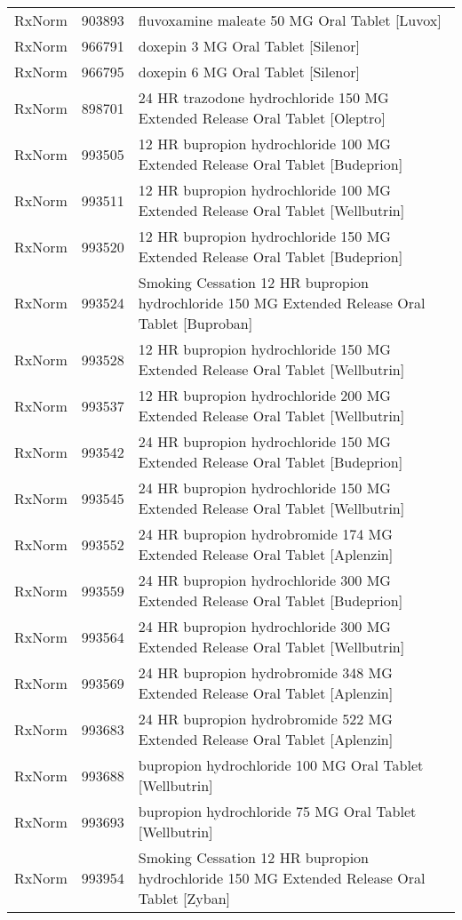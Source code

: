 \begin{longtable}{p{}p{}p{}}
  RxNorm & 903893 & fluvoxamine maleate 50 MG Oral Tablet [Luvox] \\ 
  RxNorm & 966791 & doxepin 3 MG Oral Tablet [Silenor] \\ 
  RxNorm & 966795 & doxepin 6 MG Oral Tablet [Silenor] \\ 
  RxNorm & 898701 & 24 HR trazodone hydrochloride 150 MG Extended Release Oral Tablet [Oleptro] \\ 
  RxNorm & 993505 & 12 HR bupropion hydrochloride 100 MG Extended Release Oral Tablet [Budeprion] \\ 
  RxNorm & 993511 & 12 HR bupropion hydrochloride 100 MG Extended Release Oral Tablet [Wellbutrin] \\ 
  RxNorm & 993520 & 12 HR bupropion hydrochloride 150 MG Extended Release Oral Tablet [Budeprion] \\ 
  RxNorm & 993524 & Smoking Cessation 12 HR bupropion hydrochloride 150 MG Extended Release Oral Tablet [Buproban] \\ 
  RxNorm & 993528 & 12 HR bupropion hydrochloride 150 MG Extended Release Oral Tablet [Wellbutrin] \\ 
  RxNorm & 993537 & 12 HR bupropion hydrochloride 200 MG Extended Release Oral Tablet [Wellbutrin] \\ 
  RxNorm & 993542 & 24 HR bupropion hydrochloride 150 MG Extended Release Oral Tablet [Budeprion] \\ 
  RxNorm & 993545 & 24 HR bupropion hydrochloride 150 MG Extended Release Oral Tablet [Wellbutrin] \\ 
  RxNorm & 993552 & 24 HR bupropion hydrobromide 174 MG Extended Release Oral Tablet [Aplenzin] \\ 
  RxNorm & 993559 & 24 HR bupropion hydrochloride 300 MG Extended Release Oral Tablet [Budeprion] \\ 
  RxNorm & 993564 & 24 HR bupropion hydrochloride 300 MG Extended Release Oral Tablet [Wellbutrin] \\ 
  RxNorm & 993569 & 24 HR bupropion hydrobromide 348 MG Extended Release Oral Tablet [Aplenzin] \\ 
  RxNorm & 993683 & 24 HR bupropion hydrobromide 522 MG Extended Release Oral Tablet [Aplenzin] \\ 
  RxNorm & 993688 & bupropion hydrochloride 100 MG Oral Tablet [Wellbutrin] \\ 
  RxNorm & 993693 & bupropion hydrochloride 75 MG Oral Tablet [Wellbutrin] \\ 
  RxNorm & 993954 & Smoking Cessation 12 HR bupropion hydrochloride 150 MG Extended Release Oral Tablet [Zyban] \\ 

\end{longtable}
